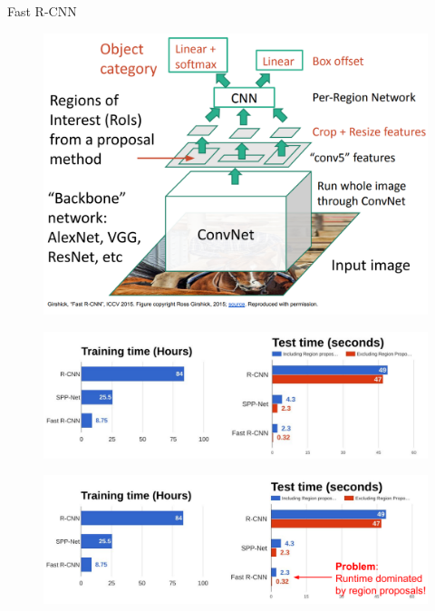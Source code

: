 \documentclass[10pt]{beamer}
\theoremstyle{remark}
\theoremstyle{definition}
\begin{document}
\begin{frame}{Fast R-CNN}
\begin{figure}
\centering
\includegraphics[width=1.0\textwidth,height=1.0\textheight,keepaspectratio]{./images/fast_rcnn_1.png}
\end{figure}

\framebreak

\begin{figure}
\centering
\includegraphics[width=1.0\textwidth,height=1.0\textheight,keepaspectratio]{./images/fast_rcnn_2.png}
\end{figure}

\framebreak

\begin{figure}
\centering
\includegraphics[width=1.0\textwidth,height=1.0\textheight,keepaspectratio]{./images/fast_rcnn_3.png}
\end{figure}
    
\end{frame}
\end{document}
